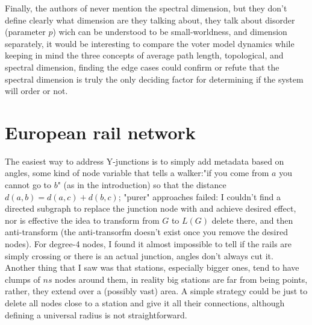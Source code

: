 \begin{appendices}
Finally, the authors of \cite{suchecki2005voter} never mention the spectral dimension, but they don't define clearly what dimension are they talking about, they talk about disorder (parameter $p$) wich can be understood to be small-worldness, and dimension separately, it would be interesting to compare the voter model dynamics while keeping in mind the three concepts of average path length, topological, and spectral dimension, finding the edge cases could confirm or refute that the spectral dimension is truly the only deciding factor for determining if the system will order or not. 
\section{European rail network}
The easiest way to address Y-junctions is to simply add metadata based on angles, some kind of node variable that tells a walker:"if you come from $a$ you cannot go to $b$" (as in the introduction) so that the distance $d(a,b) = d(a,c) + d(b,c)$; "purer" approaches failed: I couldn't find a directed subgraph to replace the junction node with and achieve desired effect, nor is effective the idea to transform from $G$ to $L(G)$ delete there, and then anti-transform (the anti-transorfm doesn't exist once you remove the desired nodes).
For degree-4 nodes, I found it almost impossible to tell if the rails are simply crossing or there is an actual junction, angles don't always cut it.\\ 
Another thing that I saw was that stations, especially bigger ones, tend to have clumps of $ns$ nodes around them, in reality big stations are far from being points, rather, they extend over a (possibly vast) area. A simple strategy could be just to delete all nodes close to a station and give it all their connections, although defining a universal radius is not straightforward.
\end{appendices}
